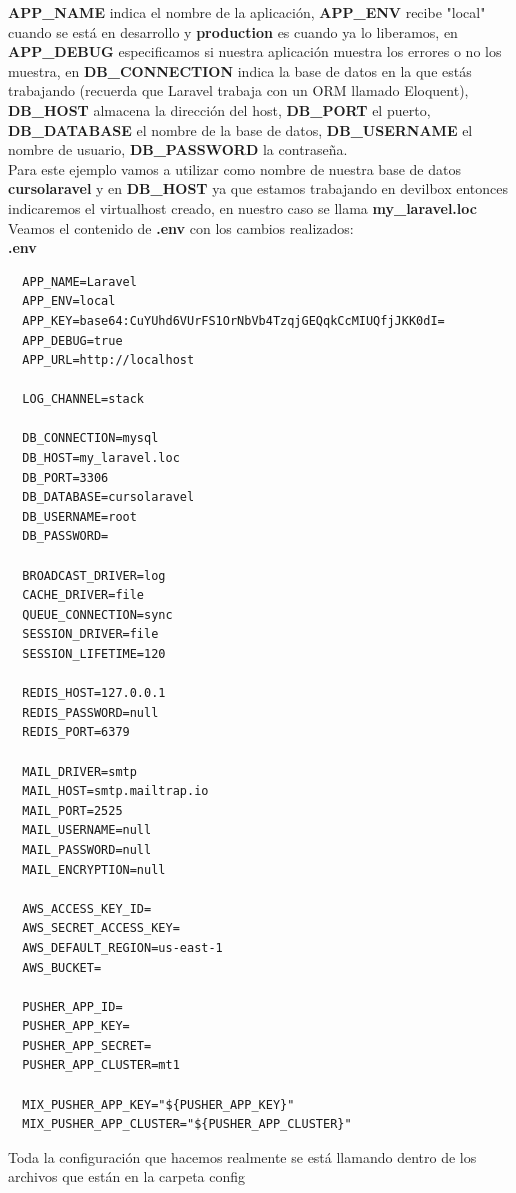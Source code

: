 \documentclass{article}
\begin{document}
\textbf{APP\_NAME} indica el nombre de la aplicación, \textbf{APP\_ENV} recibe
"local" cuando se está en desarrollo y \textbf{production} es cuando ya lo
liberamos, en \textbf{APP\_DEBUG} especificamos si nuestra aplicación muestra
los errores o no los muestra, en \textbf{DB\_CONNECTION} indica la base de datos
en la que estás trabajando (recuerda que Laravel trabaja con un ORM llamado
Eloquent), \textbf{DB\_HOST} almacena la dirección del host, \textbf{DB\_PORT} el
puerto, \textbf{DB\_DATABASE} el nombre de la base de datos,
\textbf{DB\_USERNAME} el nombre de usuario, \textbf{DB\_PASSWORD} la
contraseña.\\

Para este ejemplo vamos a utilizar como nombre de nuestra base de datos
\textbf{cursolaravel} y en  \textbf{DB\_HOST} ya que estamos trabajando en
devilbox entonces indicaremos el virtualhost creado, en nuestro caso se llama
\textbf{my\_laravel.loc}\\

Veamos el contenido de \textbf{.env} con los cambios realizados:\\

\textbf{.env}
\begin{verbatim}
  APP_NAME=Laravel
  APP_ENV=local
  APP_KEY=base64:CuYUhd6VUrFS1OrNbVb4TzqjGEQqkCcMIUQfjJKK0dI=
  APP_DEBUG=true
  APP_URL=http://localhost

  LOG_CHANNEL=stack

  DB_CONNECTION=mysql
  DB_HOST=my_laravel.loc
  DB_PORT=3306
  DB_DATABASE=cursolaravel
  DB_USERNAME=root
  DB_PASSWORD=

  BROADCAST_DRIVER=log
  CACHE_DRIVER=file
  QUEUE_CONNECTION=sync
  SESSION_DRIVER=file
  SESSION_LIFETIME=120

  REDIS_HOST=127.0.0.1
  REDIS_PASSWORD=null
  REDIS_PORT=6379

  MAIL_DRIVER=smtp
  MAIL_HOST=smtp.mailtrap.io
  MAIL_PORT=2525
  MAIL_USERNAME=null
  MAIL_PASSWORD=null
  MAIL_ENCRYPTION=null

  AWS_ACCESS_KEY_ID=
  AWS_SECRET_ACCESS_KEY=
  AWS_DEFAULT_REGION=us-east-1
  AWS_BUCKET=

  PUSHER_APP_ID=
  PUSHER_APP_KEY=
  PUSHER_APP_SECRET=
  PUSHER_APP_CLUSTER=mt1

  MIX_PUSHER_APP_KEY="${PUSHER_APP_KEY}"
  MIX_PUSHER_APP_CLUSTER="${PUSHER_APP_CLUSTER}"
\end{verbatim}


Toda la configuración que hacemos realmente se está llamando dentro de los
archivos que están en la carpeta config\\
\end{document}
